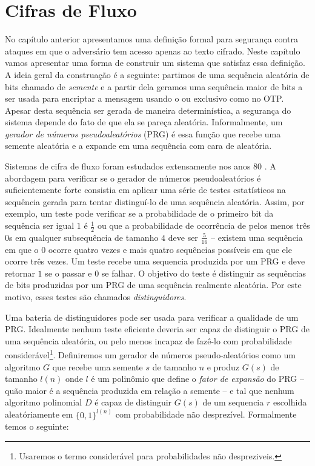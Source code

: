 \chapter{Cifras de Fluxo}
\label{cha:cifras-de-fluxo}

No capítulo anterior apresentamos uma definição formal para segurança contra ataques em que o adversário tem acesso apenas ao texto cifrado.
Neste capítulo vamos apresentar uma forma de construir um sistema que satisfaz essa definição.
A ideia geral da construação é a seguinte: partimos de uma sequência aleatória de bits chamado de {\em semente} e a partir dela geramos uma sequência maior de bits a ser usada para encriptar a mensagem usando o ou exclusivo como no OTP.
Apesar desta sequência ser gerada de maneira determinística, a segurança do sistema depende do fato de que ela se pareça aleatória.
Informalmente, um {\em gerador de números pseudoaleatórios} (PRG) é essa função que recebe uma semente aleatória e a expande em uma sequência com cara de aleatória.

Sistemas de cifra de fluxo foram estudados extensamente nos anos 80 \cite{Blum84,Yao82}.
A abordagem para verificar se o gerador de números pseudoaleatórios é suficientemente forte consistia em aplicar uma série de testes estatísticos na sequência gerada para tentar distinguí-lo de uma sequência aleatória.
Assim, por exemplo, um teste pode verificar se a probabilidade de o primeiro bit da sequência ser igual $1$ é $\frac{1}{2}$ ou que a probabilidade de ocorrência de pelos menos três $0$s em qualquer subsequência de tamanho $4$ deve ser $\frac{5}{16}$ -- existem uma sequência em que o $0$ ocorre quatro vezes e mais quatro sequências possíveis em que ele ocorre três vezes.
Um teste recebe uma sequencia produzida por um PRG e deve retornar $1$ se o passar e $0$ se falhar.
O objetivo do teste é distinguir as sequências de bits produzidas por um PRG de uma sequência realmente aleatória.
Por este motivo, esses testes são chamados {\em distinguidores}.

Uma bateria de distinguidores pode ser usada para verificar a qualidade de um PRG.
Idealmente nenhum teste eficiente deveria ser capaz de distinguir o PRG de uma sequência aleatória, ou pelo menos incapaz de fazê-lo com probabilidade considerável\footnote{Usaremos o termo considerável para probabilidades não despreziveis.}.
Definiremos um gerador de números pseudo-aleatórios como um algoritmo $G$ que recebe uma semente $s$ de tamanho $n$ e produz $G(s)$ de tamanho $l(n)$ onde $l$ é um polinômio que define o {\em fator de expansão} do PRG -- quão maior é a sequência produzida em relação a semente -- e tal que nenhum algoritmo polinomial $D$ é capaz de distinguir $G(s)$ de um sequencia $r$ escolhida aleatóriamente em $\{0,1\}^{l(n)}$ com probabilidade não desprezível.
Formalmente temos o seguinte:


